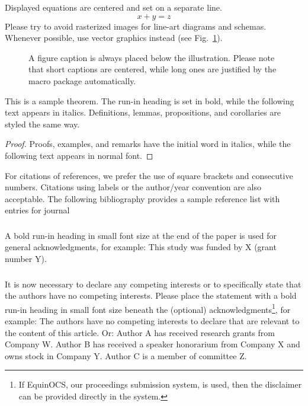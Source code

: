 \documentclass[runningheads]{llncs}
\begin{document}
\noindent Displayed equations are centered and set on a separate
line.
\begin{equation}
x + y = z
\end{equation}
Please try to avoid rasterized images for line-art diagrams and
schemas. Whenever possible, use vector graphics instead (see
Fig.~\ref{fig1}).

\begin{figure}
\caption{A figure caption is always placed below the illustration.
Please note that short captions are centered, while long ones are
justified by the macro package automatically.} \label{fig1}
\end{figure}

\begin{theorem}
This is a sample theorem. The run-in heading is set in bold, while
the following text appears in italics. Definitions, lemmas,
propositions, and corollaries are styled the same way.
\end{theorem}
%
%
\begin{proof}
Proofs, examples, and remarks have the initial word in italics,
while the following text appears in normal font.
\end{proof}
For citations of references, we prefer the use of square brackets
and consecutive numbers. Citations using labels or the author/year
convention are also acceptable. The following bibliography provides
a sample reference list with entries for journal

\begin{credits}
\subsubsection{\ackname} A bold run-in heading in small font size at the end of the paper is
used for general acknowledgments, for example: This study was funded
by X (grant number Y).

\subsubsection{\discintname}
It is now necessary to declare any competing interests or to specifically
state that the authors have no competing interests. Please place the
statement with a bold run-in heading in small font size beneath the
(optional) acknowledgments\footnote{If EquinOCS, our proceedings submission
system, is used, then the disclaimer can be provided directly in the system.},
for example: The authors have no competing interests to declare that are
relevant to the content of this article. Or: Author A has received research
grants from Company W. Author B has received a speaker honorarium from
Company X and owns stock in Company Y. Author C is a member of committee Z.
\end{credits}
%
%
%
% 
% 
%



\end{document}
